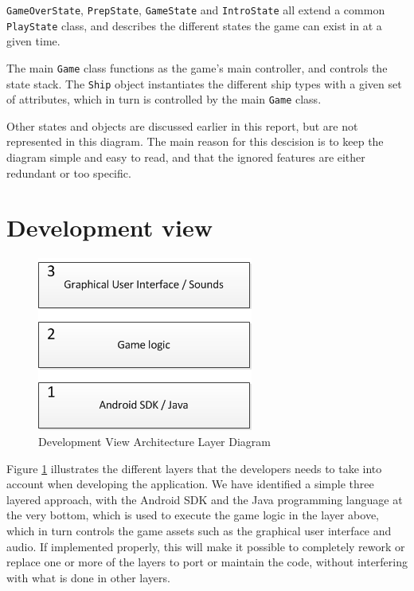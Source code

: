 \texttt{GameOverState}, \texttt{PrepState}, \texttt{GameState} and \texttt{IntroState} all extend a common \texttt{PlayState} class, and describes the different states the game can exist in at a given time.

The main \texttt{Game} class functions as the game's main controller, and controls the state stack. The \texttt{Ship} object instantiates the different ship types with a given set of attributes, which in turn is controlled by the main \texttt{Game} class.

Other states and objects are discussed earlier in this report, but are not represented in this diagram. The main reason for this descision is to keep the diagram simple and easy to read, and that the ignored features are either redundant or too specific.



\section{Development view}


\begin{figure}[ht]
    \includegraphics{DevelopmentView.png}
    \caption{Development View Architecture Layer Diagram}
    \label{fig:DevelopmentView}
\end{figure}

Figure \ref{fig:DevelopmentView} illustrates the different layers that the developers needs to take into account when developing the application. We have identified a simple three layered approach, with the Android SDK and the Java programming language at the very bottom, which is used to execute the game logic in the layer above, which in turn controls the game assets such as the graphical user interface and audio. If implemented properly, this will make it possible to completely rework or replace one or more of the layers to port or maintain the code, without interfering with what is done in other layers.


